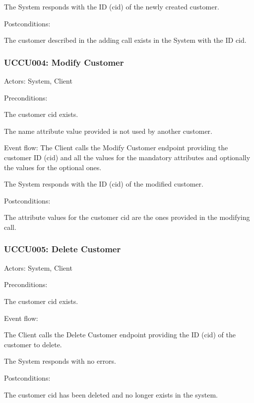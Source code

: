 \ucitem The System responds with the ID (cid) of the newly created customer.

Postconditions:

\ucitem The customer described in the adding call exists in the System with the ID cid.

\subsubsection{UCCU004: Modify Customer}
\label{UCCU004}

Actors: System, Client

Preconditions:

\ucitem The customer cid exists.

\ucitem The name attribute value provided is not used by another customer.

Event flow:
\ucitem The Client calls the Modify Customer endpoint providing the customer ID (cid) and all the values for the mandatory attributes and optionally the values for the optional 
ones.

\ucitem The System responds with the ID (cid) of the modified customer.

Postconditions:

\ucitem The attribute values for the customer cid are the ones provided in the modifying call.

\subsubsection{UCCU005: Delete Customer}
\label{UCCU005}

Actors: System, Client

Preconditions:

\ucitem The customer cid exists.

Event flow:

\ucitem The Client calls the Delete Customer endpoint providing the ID (cid) of the customer to delete.

\ucitem The System responds with no errors.

Postconditions:

\ucitem The customer cid has been deleted and no longer exists in the system.